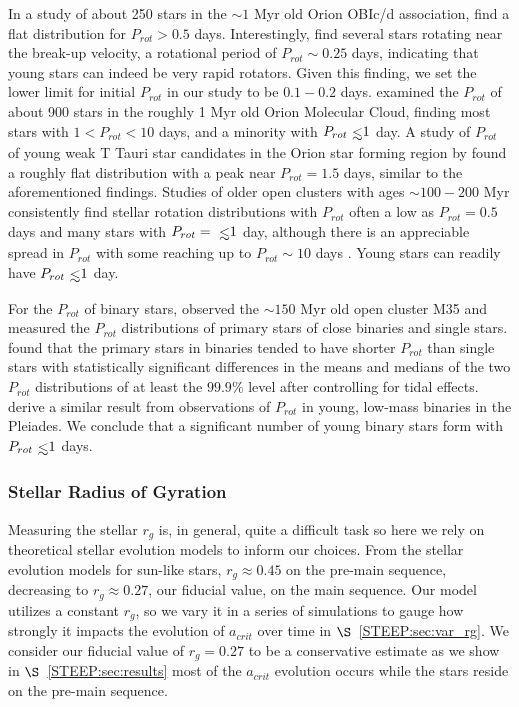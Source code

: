 In a study of about 250 stars in the ${\sim}1$ Myr old Orion OBIc/d association, \citet{Stassun1999} find a flat distribution for $P_{rot} > 0.5$ days.  Interestingly, \citet{Stassun1999} find several stars rotating near the break-up velocity, a rotational period of $P_{rot}{\sim} 0.25$ days, indicating that young stars can indeed be very rapid rotators.  Given this finding, we set the lower limit for initial $P_{rot}$ in our study to be $0.1-0.2$ days.  \citet{Rebull2006} examined the $P_{rot}$ of about 900 stars in the roughly 1 Myr old Orion Molecular Cloud, finding most stars with $1 < P_{rot} < 10$ days, and a minority with $P_{rot} \lsim 1$ day.  A study of $P_{rot}$ of young weak T Tauri star candidates in the Orion star forming region by \citet{Marilli2007} found a roughly flat distribution with a peak near $P_{rot} = 1.5$ days, similar to the aforementioned findings.  Studies of older open clusters with ages ${\sim}100-200$ Myr consistently find stellar rotation distributions with $P_{rot}$ often a low as $P_{rot} = 0.5$ days and many stars with $P_{rot} = \lsim 1$ day, although there is an appreciable spread in $P_{rot}$ with some reaching up to $P_{rot} {\sim} 10$ days \citep[see][]{Marilli2007,Meibom2009,Meibom2011}.  Young stars can readily have $P_{rot} \lsim 1$ day.

For the $P_{rot}$ of binary stars, \citet{Meibom2007} observed the ${\sim}150$ Myr old open cluster M35 and measured the $P_{rot}$ distributions of primary stars of close binaries and single stars.  \citet{Meibom2007} found that the primary stars in binaries tended to have shorter $P_{rot}$ than single stars with statistically significant differences in the means and medians of the two $P_{rot}$ distributions of at least the $99.9\%$ level after controlling for tidal effects.  \citet{Stauffer2016} derive a similar result from observations of $P_{rot}$ in young, low-mass binaries in the Pleiades.  We conclude that a significant number of young binary stars form with $P_{rot} \lsim 1$ days. 

\subsubsection{Stellar Radius of Gyration} \label{STEEP:sec:r_g}

Measuring the stellar $r_g$ is, in general, quite a difficult task so here we rely on theoretical stellar evolution models to inform our choices.  From the \citet{Baraffe2015} stellar evolution models for sun-like stars, $r_g{\approx}0.45$ on the pre-main sequence, decreasing to $r_g{\approx}0.27$, our fiducial value, on the main sequence.  Our model utilizes a constant $r_g$, so we vary it in a series of simulations to gauge how strongly it impacts the evolution of $a_{crit}$ over time in $\S$~\ref{STEEP:sec:var_rg}.  We consider our fiducial value of $r_g = 0.27$ to be a conservative estimate as we show in $\S$~\ref{STEEP:sec:results} most of the $a_{crit}$ evolution occurs while the stars reside on the pre-main sequence.

